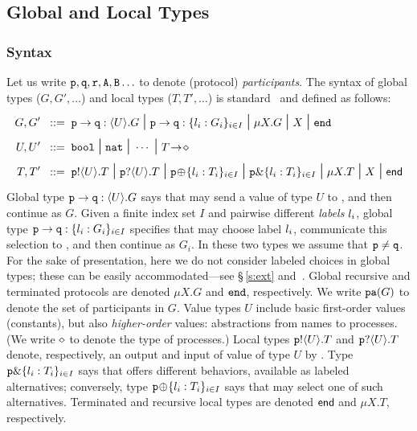 \documentclass[runningheads]{llncs}
\begin{document}
\subsection{Global and Local Types}

\subsubsection{Syntax}
Let us write $\mathtt{p}, \mathtt{q}, \mathtt{r}, \mathtt{A}, \mathtt{B} \ldots$ to denote (protocol) \emph{participants}.
The syntax of global types ($G, G', \ldots$) and local types  ($T, T', \ldots$) is standard~\cite{HYC08} and defined as follows:
\begin{align*}
			G, G'  \bnfis & \gtcom{p}{q}{U}{G} %
			\sbnfbar
			\gtcho{p}{q}{\lbl_i}{G_i} %
			\sbnfbar %
			\mu X. G \sbnfbar X \sbnfbar \gend \\
			U, U'  \bnfis & \bool \sbnfbar \nat \sbnfbar \cdots %
			\sbnfbar \shot{T} \\
	    	T, T'  \bnfis & \ltout{p}{U}{T} \sbnfbar \ltinp{p}{U}{T} %
		  \sbnfbar %
		  \ltsel{p}{\lbl_i}{T_i}{i}{I} \sbnfbar \ltbra{p}{\lbl_i}{T_i}{i}{I}  
		\sbnfbar  \mu X. T \sbnfbar X \sbnfbar \lend 
\end{align*}
\noindent
Global type $\mathtt{p}\to\mathtt{q}:\langle U\rangle.G$ says that \p may send a value of type $U$ to \q, and then continue as $G$.
Given a finite index set $I$ and pairwise different \emph{labels} $l_i$, global type $\mathtt{p}\to\mathtt{q}:\{l_i:G_i\}_{i \in I}$ specifies that  \p may choose  label $l_i$, communicate this selection to \q, and then continue as $G_i$.
In these two types %
we assume that $\mathtt{p} \neq \mathtt{q}$.
For the sake of presentation, here 
we do not consider labeled choices in global types; these can be easily accommodated---see \S\,\ref{s:ext} and~\cite{MezzinaP17arxiv}.
Global %
recursive and terminated protocols are denoted $\mu X. G$ and $\mathtt{end}$, respectively.
We write $\mathtt{\mathtt{pa}}(G)$ to denote the set of participants in $G$.
Value types $U$ include basic first-order values (constants),   but also \emph{higher-order} values: abstractions from names to processes. 
(We write $\diamond$ to denote the type of processes.)
Local types 
$\mathtt{p}!\langle U\rangle.T$ and $\mathtt{p}?\langle U\rangle.T$ denote, respectively, an output and input of value of type $U$ by \p.
Type $\mathtt{p}\&\{l_i: T_i\}_{i \in I}$ says that \p 
offers different behaviors, available as labeled alternatives;
conversely, type $\mathtt{\mathtt{p}}\!\oplus\!\{l_i: T_i\}_{i \in I}$ 
says that \p may select one of such alternatives.
 Terminated and recursive local types are denoted $\mathsf{end}$ and $\mu X. T$, respectively. 
\end{document}
